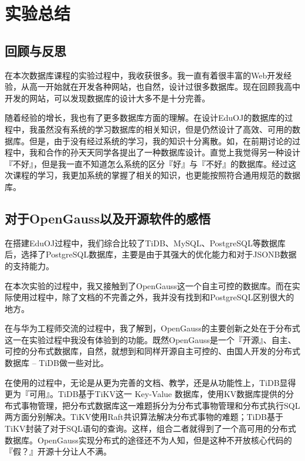 \documentclass{ctexrep}
\begin{document}
\setlength\parindent{2\ccwd}

\chapter{实验总结}
\section{回顾与反思}

在本次数据库课程的实验过程中，我收获很多。我一直有着很丰富的Web开发经验，从高一开始就在开发各种网站，也自然，设计过很多数据库。现在回顾我高中开发的网站，可以发现数据库的设计大多不是十分完善。

随着经验的增长，我也有了更多数据库方面的理解。在设计EduOJ的数据库的过程中，我虽然没有系统的学习数据库的相关知识，但是仍然设计了高效、可用的数据库。但是，由于没有经过系统的学习，我的知识十分离散。如，在前期讨论的过程中，我和合作的孙天天同学各提出了一种数据库设计。直觉上我觉得另一种设计『不好』，但是我一直不知道怎么系统的区分『好』与『不好』的数据库。经过这次课程的学习，我更加系统的掌握了相关的知识，也更能按照符合通用规范的数据库。

\section{对于OpenGauss以及开源软件的感悟}
在搭建EduOJ过程中，我们综合比较了TiDB、MySQL、PostgreSQL等数据库后，选择了PostgreSQL数据库，主要是由于其强大的优化能力和对于JSONB数据的支持能力。

在本次实验的过程中，我又接触到了OpenGauss这一个自主可控的数据库。而在实际使用过程中，除了文档的不完善之外，我并没有找到和PostgreSQL区别很大的地方。

在与华为工程师交流的过程中，我了解到，OpenGauss的主要创新之处在于分布式这一在实验过程中我没有体验到的功能。既然OpenGauss是一个『开源』、自主、可控的分布式数据库，自然，就想到和同样开源自主可控的、由国人开发的分布式数据库 -- TiDB做一些对比。

在使用的过程中，无论是从更为完善的文档、教学，还是从功能性上，TiDB显得更为『可用』。TiDB基于TiKV这一 Key-Value 数据库，使用KV数据库提供的分布式事物管理，把分布式数据库这一难题拆分为分布式事物管理和分布式执行SQL两方面分别解决。TiKV使用Raft共识算法解决分布式事物的难题；TiDB基于TiKV封装了对于SQL语句的查询。这样，组合二者就得到了一个高可用的分布式数据库。OpenGauss实现分布式的途径还不为人知，但是这种不开放核心代码的『假？』开源十分让人不满。
\end{document}
